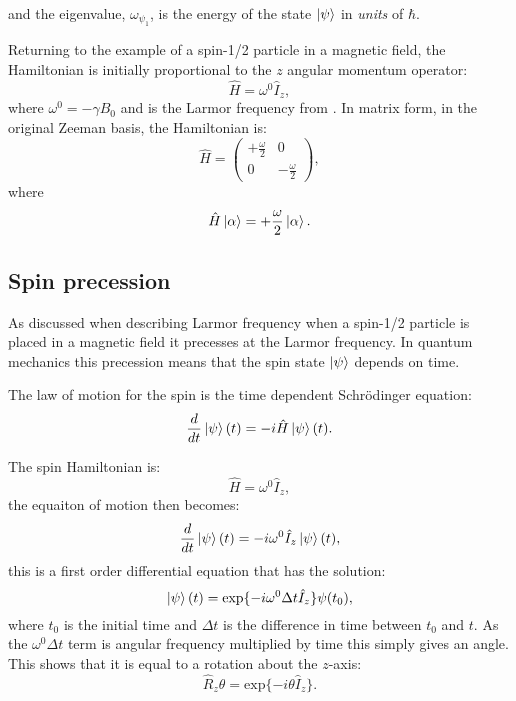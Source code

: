 and the eigenvalue, $\omega_{\psi_1}$, is the energy of the state $\ket{\psi}$ in \textit{units} of $\hbar$.

Returning to the example of a spin-1/2 particle in a magnetic field, the Hamiltonian is initially
proportional to the $z$ angular momentum operator:
\begin{equation}
  \hat{H} = \omega^0\hat{I}_z,
\end{equation}
where $\omega^0 = -\gamma B_0$ and is the Larmor frequency from . In matrix form, in the original Zeeman basis, the Hamiltonian is:
\begin{equation}
  \hat{H} = \begin{pmatrix}
+\frac{\omega}{2} & 0\\
0 & -\frac{\omega}{2}
\end{pmatrix},
\end{equation}
where
\begin{equation}
  \hat{H}\ket{\alpha} = +\frac{\omega}{2}\ket{\alpha}.
\end{equation}

\subsection{Spin precession}

 As discussed when describing Larmor frequency when a spin-1/2 particle is placed in
 a magnetic field it precesses at the Larmor frequency. In quantum mechanics this precession
 means that the spin state $\ket{\psi}$ depends on time.

 The law of motion for the spin is the time dependent Schr\"odinger equation:
 \begin{equation}
   \frac{d}{dt}\ket{\psi}(t) = -i\hat{H}\ket{\psi}(t).
 \end{equation}

  The spin Hamiltonian is:
  \begin{equation}
    \hat{H} = \omega^0\hat{I}_z,
  \end{equation}
the equaiton of motion then becomes:
\begin{equation}
  \frac{d}{dt}\ket{\psi}(t) = -i\omega^0\hat{I}_z\ket{\psi}(t),
\end{equation}
this is a first order differential equation that has the solution:
\begin{equation}
  \ket{\psi}(t) = \text{exp}\{-i\omega^0\Delta{t}\hat{I}_z\}{\psi}(t_0),
\end{equation}
where $t_0$ is the initial time and $\Delta{t}$ is the difference in time
between $t_0$ and $t$. As the $\omega^0\Delta{t}$ term is angular frequency multiplied by
time this simply gives an angle. This shows that it is equal to a rotation about the $z$-axis:
\begin{equation}
  \hat{R}_z{\theta} = \text{exp}\{-i\theta\hat{I}_z\}.
\end{equation}

